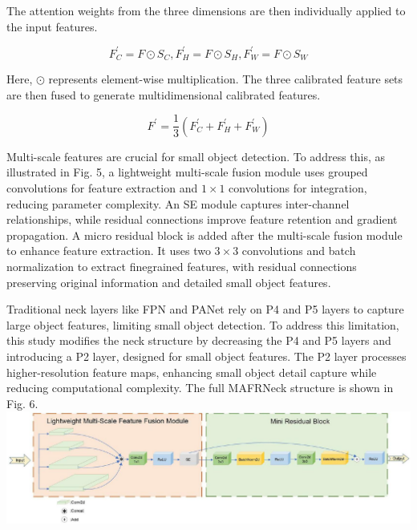 \documentclass{article}
\begin{document}
The attention weights from the three dimensions are then individually applied to the input features.


\begin{equation*}
F_{C}^{\prime}=F \odot S_{C}, F_{H}^{\prime}=F \odot S_{H}, F_{W}^{\prime}=F \odot S_{W} \tag{8}
\end{equation*}


Here, $\odot$ represents element-wise multiplication. The three calibrated feature sets are then fused to generate multidimensional calibrated features.


\begin{equation*}
F^{\prime}=\frac{1}{3}\left(F_{C}^{\prime}+F_{H}^{\prime}+F_{W}^{\prime}\right) \tag{9}
\end{equation*}


Multi-scale features are crucial for small object detection. To address this, as illustrated in Fig. 5, a lightweight multi-scale fusion module uses grouped convolutions for feature extraction and $1 \times 1$ convolutions for integration, reducing parameter complexity. An SE module captures inter-channel relationships, while residual connections improve feature retention and gradient propagation. A micro residual block is added after the multi-scale fusion module to enhance feature extraction. It uses two $3 \times 3$ convolutions and batch normalization to extract finegrained features, with residual connections preserving original information and detailed small object features.

Traditional neck layers like FPN and PANet rely on P4 and P5 layers to capture large object features, limiting small object detection. To address this limitation, this study modifies the neck structure by decreasing the P4 and P5 layers and introducing a P2 layer, designed for small object features. The P2 layer processes higher-resolution feature maps, enhancing small object detail capture while reducing computational complexity. The full MAFRNeck structure is shown in Fig. 6.\\
\includegraphics[max width=\textwidth, center]{2025_08_05_34f8389150f57116e76bg-07(1)}
\end{document}

